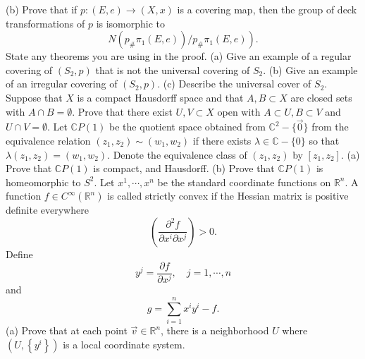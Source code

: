 \documentclass[14pt]{extarticle}
\begin{document}
(b) Prove that if $p:(E, e) \rightarrow(X, x)$ is a covering map, then the group of deck transformations of $p$ is isomorphic to
$$
\left.N\left(p_{\#} \pi_{1}(E, e)\right) / p_{\#} \pi_{1}(E, e)\right) .
$$
State any theorems you are using in the proof.
\newpage
(a) Give an example of a regular covering of $\left(S_{2}, p\right)$ that is not the universal covering of $S_{2}$.
(b) Give an example of an irregular covering of $\left(S_{2}, p\right)$.
(c) Describe the universal cover of $S_{2}$.
\newpage
Suppose that $X$ is a compact Hausdorff space and that $A, B \subset X$ are closed sets with $A \cap B=\emptyset$. Prove that there exist $U, V \subset X$ open with $A \subset U, B \subset V$ and $U \cap V=\emptyset$.
\newpage
Let $\mathbb{C} P(1)$ be the quotient space obtained from $\mathbb{C}^{2}-\{\overrightarrow{0}\}$ from the equivalence relation $\left(z_{1}, z_{2}\right) \sim\left(w_{1}, w_{2}\right)$ if there exists $\lambda \in \mathbb{C}-\{0\}$ so that $\lambda\left(z_{1}, z_{2}\right)=\left(w_{1}, w_{2}\right)$. Denote the equivalence class of $\left(z_{1}, z_{2}\right)$ by $\left[z_{1}, z_{2}\right]$.
(a) Prove that $\mathbb{C} P(1)$ is compact, and Hausdorff.
(b) Prove that $\mathbb{C} P(1)$ is homeomorphic to $S^{2}$.
\newpage
Let $x^{1}, \cdots, x^{n}$ be the standard coordinate functions on $\mathbb{R}^{n}$. A function $f \in C^{\infty}\left(\mathbb{R}^{n}\right)$ is called strictly convex if the Hessian matrix is positive definite everywhere
$$
\left(\frac{\partial^{2} f}{\partial x^{i} \partial x^{j}}\right)>0 .
$$
Define
$$
y^{j}=\frac{\partial f}{\partial x^{j}}, \quad j=1, \cdots, n
$$
and
$$
g=\sum_{i=1}^{n} x^{i} y^{i}-f .
$$
(a) Prove that at each point $\vec{v} \in \mathbb{R}^{n}$, there is a neighborhood $U$ where $\left(U,\left\{y^{i}\right\}\right)$ is a local coordinate system.
\end{document}
